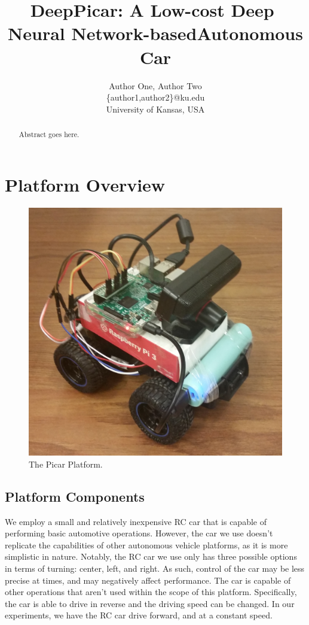 \documentclass[10pt, conference]{IEEEtran}
\begin{document}
\title{DeepPicar:​ ​A​ ​Low-cost​ ​Deep​ ​Neural​ ​Network-based​ ​Autonomous​ ​Car}
\author{Author One, Author Two\\
\{author1,author2\}@ku.edu\\
University of Kansas, USA\\ 
}

\maketitle
\thispagestyle{empty}
\begin{abstract}

Abstract goes here.

\end{abstract}






\section{Platform Overview}

\begin{figure}[h]
  \centering
  \includegraphics[width=.4\textwidth]{Picar_Picture}
  \caption{ The Picar Platform. }
\end{figure}

\subsection{Platform Components}
We employ a small and relatively inexpensive RC car that is capable of performing basic automotive 
operations. However, the car we use doesn't replicate the capabilities of other autonomous vehicle 
platforms, as it is more simplistic in nature. Notably, the RC car we use only has three possible 
options in terms of turning: center, left, and right. As such, control of the car may be less precise at 
times, and may negatively affect performance. The car is capable of other operations that aren't used 
within the scope of this platform. Specifically, the car is able to drive in reverse and the driving 
speed can be changed. In our experiments, we have the RC car drive forward, and at a constant speed.
\end{document}
